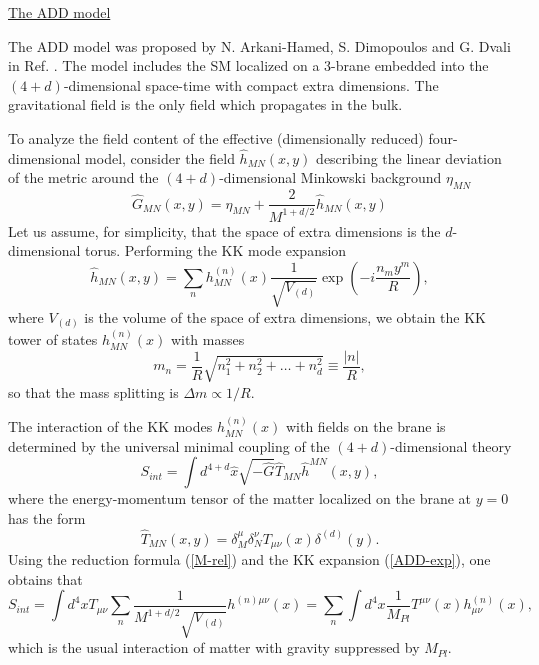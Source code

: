 \documentclass{cernyrep}
\begin{document}
\underline{The ADD model}

The ADD model was proposed  by N. Arkani-Hamed, S. Dimopoulos and
G. Dvali in Ref. \cite{ADD}. The model includes the SM localized
on a 3-brane embedded into the $(4+d)$-dimensional space-time with
compact extra dimensions. The gravitational field is the only
field which propagates in the bulk.

 To analyze the field content of the effective
(dimensionally reduced) four-dimensional model, consider the field
$\hat{h}_{MN}(x,y)$ describing the linear deviation of the metric
around the $(4+d)$-dimensional Minkowski background $\eta_{MN}$
\begin{equation}\label{ADD:Gh}
  \hat{G}_{MN} (x,y) = \eta_{MN} +
\frac{2}{M^{1+d/2}} \hat{h}_{MN}(x,y)
\end{equation}
Let us assume, for simplicity, that the space of extra dimensions
is the $d$-dimensional torus. Performing the KK mode expansion
\begin{equation}\label{ADD-exp}
  \hat{h}_{MN} (x,y) =
\sum_{n} h^{(n)}_{MN} (x) \frac{1}{\sqrt{V_{(d)}}}
\exp(-i\frac{n_{m}y^{m}}{R}),
\end{equation}
where $V_{(d)}$ is the volume of the space of extra dimensions, we
obtain the KK tower of states $h^{(n)}_{MN} (x)$ with masses
\begin{equation}\label{ADD-mass}
m_{n} = \frac{1}{R} \sqrt{n_{1}^{2}+n_{2}^{2}+ \ldots + n_{d}^{2}}
\equiv \frac{|n|}{R},
\end{equation}
 so that the mass splitting  is $\Delta m \propto 1/R.$

The interaction of the KK modes $h^{(n)}_{MN}(x)$ with fields on
the brane is determined by the universal minimal coupling of the
$(4+d)$-dimensional theory
\[
S_{int} = \int d^{4+d}\hat{x} \sqrt{-\hat{G}} \hat{T}_{MN}
\hat{h}^{MN} (x,y),
\]
where the energy-momentum tensor of the matter  localized on the
brane at $y=0$ has the form
\[
\hat{T}_{MN}(x,y) = \delta_{M}^{\mu} \delta_{N}^{\nu} T_{\mu
\nu}(x) \delta^{(d)}(y).
\]
Using the reduction formula (\ref{M-rel}) and the KK expansion
(\ref{ADD-exp}), one obtains that
\begin{equation}
  S_{int} =   \int d^{4}x
T_{\mu \nu} \sum_{n} \frac{1}{M^{1+d/2} \sqrt{V_{(d)}}} h^{(n)\mu
\nu} (x) =  \sum_{n} \int d^{4}x \frac{1}{M_{Pl}} T^{\mu \nu}(x)
h^{(n)}_{\mu \nu}(x), \label{ADD-int1}
\end{equation}
which is the usual interaction of matter with gravity suppressed
by $M_{Pl}$.
\end{document}
